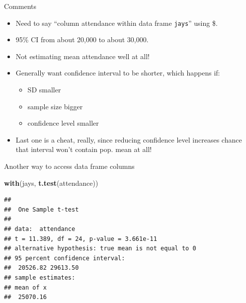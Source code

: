 \documentclass[
  ignorenonframetext,
]{beamer}
\newenvironment{Shaded}{\begin{snugshade}}{\end{snugshade}}
\newcommand{\KeywordTok}[1]{\textcolor[rgb]{0.13,0.29,0.53}{\textbf{#1}}}
\newcommand{\NormalTok}[1]{#1}
\providecommand{\tightlist}{%
  \setlength{\itemsep}{0pt}\setlength{\parskip}{0pt}}
\begin{document}
\begin{frame}[fragile]{Comments}
\protect\hypertarget{comments-1}{}

\begin{itemize}
\tightlist
\item
  Need to say ``column attendance within data frame \texttt{jays}''
  using \$.
\item
  95\% CI from about 20,000 to about 30,000.
\item
  Not estimating mean attendance well at all!
\item
  Generally want confidence interval to be shorter, which happens if:

  \begin{itemize}
  \tightlist
  \item
    SD smaller
  \item
    sample size bigger
  \item
    confidence level smaller
  \end{itemize}
\item
  Last one is a cheat, really, since reducing confidence level increases
  chance that interval won't contain pop. mean at all!
\end{itemize}

\end{frame}

\begin{frame}[fragile]{Another way to access data frame columns}
\protect\hypertarget{another-way-to-access-data-frame-columns}{}

\begin{Shaded}
\begin{Highlighting}[]
\KeywordTok{with}\NormalTok{(jays, }\KeywordTok{t.test}\NormalTok{(attendance))}
\end{Highlighting}
\end{Shaded}

\begin{verbatim}
## 
##  One Sample t-test
## 
## data:  attendance
## t = 11.389, df = 24, p-value = 3.661e-11
## alternative hypothesis: true mean is not equal to 0
## 95 percent confidence interval:
##  20526.82 29613.50
## sample estimates:
## mean of x 
##  25070.16
\end{verbatim}

\end{frame}
\end{document}
